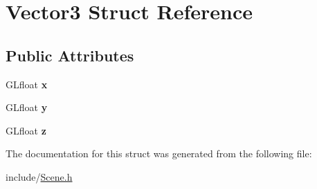 \hypertarget{structVector3}{\section{Vector3 Struct Reference}
\label{structVector3}
}
\subsection*{Public Attributes}
\begin{DoxyCompactItemize}
\item 
\hypertarget{structVector3_a6ec3f95e5fb0ee725d5fbdb8f17cebf6}{G\-Lfloat {\bfseries x}}\label{structVector3_a6ec3f95e5fb0ee725d5fbdb8f17cebf6}

\item 
\hypertarget{structVector3_a0e05f1adf7616989f7f89fed6cb4e873}{G\-Lfloat {\bfseries y}}\label{structVector3_a0e05f1adf7616989f7f89fed6cb4e873}

\item 
\hypertarget{structVector3_a062291c1bffe3f872c3fe6eda01f897e}{G\-Lfloat {\bfseries z}}\label{structVector3_a062291c1bffe3f872c3fe6eda01f897e}

\end{DoxyCompactItemize}


The documentation for this struct was generated from the following file\-:\begin{DoxyCompactItemize}
\item 
include/\hyperlink{Scene_8h}{Scene.\-h}\end{DoxyCompactItemize}
